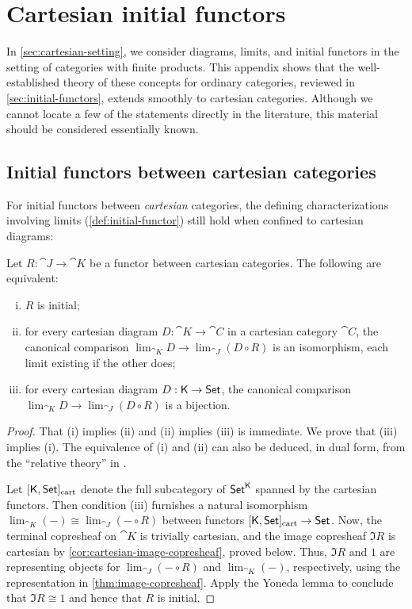 \documentclass[11pt]{article}
\numberwithin{equation}{section}
\begin{document}
\section{Cartesian initial functors}
\label{sec:cartesian-initial-functors}

In \cref{sec:cartesian-setting}, we consider diagrams, limits, and initial
functors in the setting of categories with finite products. This appendix shows
that the well-established theory of these concepts for ordinary categories,
reviewed in \cref{sec:initial-functors}, extends smoothly to cartesian
categories. Although we cannot locate a few of the statements directly in the
literature, this material should be considered essentially known.

\subsection{Initial functors between cartesian categories}

For initial functors between \emph{cartesian} categories, the defining
characterizations involving limits (\cref{def:initial-functor}) still hold when
confined to cartesian diagrams:

\begin{proposition}
  \label{prop:cartesian-initial-functor}
  Let $R: \cat{J} \to \cat{K}$ be a functor between cartesian categories.
  The following are equivalent:
  \begin{enumerate}[(i)]
    \item $R$ is initial;
    \item for every cartesian diagram $D: \cat{K} \to \cat{C}$ in a cartesian category
      $\cat{C}$, the canonical comparison
      $\lim_{\cat{K}} D \to \lim_{\cat{J}} (D \circ R)$ is an isomorphism, each limit
      existing if the other does;
    \item for every cartesian diagram $D: \mathsf{K} \to \mathsf{Set}$, the canonical comparison
      $\lim_{\cat{K}} D \to \lim_{\cat{J}} (D \circ R)$ is a bijection.
  \end{enumerate}
\end{proposition}
\begin{proof}
  That (i) implies (ii) and (ii) implies (iii) is immediate. We prove that (iii)
  implies (i). The equivalence of (i) and (ii) can also be deduced, in dual
  form, from the ``relative theory'' in \cite[\S\S{5--6}]{pare1973}.

  Let $[\mathsf{K}, \mathsf{Set}]_{\mathrm{cart}}$ denote the full subcategory of
  $\mathsf{Set}^{\mathsf{K}}$ spanned by the cartesian functors. Then condition (iii)
  furnishes a natural isomorphism
  $\lim_{\cat{K}} (-) \cong \lim_{\cat{J}}(- \circ R)$ between functors
  $[\mathsf{K}, \mathsf{Set}]_{\mathrm{cart}} \to \mathsf{Set}$. Now, the terminal copresheaf on
  $\cat{K}$ is trivially cartesian, and the image copresheaf $\Im R$ is
  cartesian by \cref{cor:cartesian-image-copresheaf}, proved below. Thus,
  $\Im R$ and $1$ are representing objects for $\lim_{\cat{J}}(- \circ R)$ and
  $\lim_{\cat{K}}(-)$, respectively, using the representation in
  \cref{thm:image-copresheaf}. Apply the Yoneda lemma to conclude that
  $\Im R \cong 1$ and hence that $R$ is initial.
\end{proof}
\end{document}
